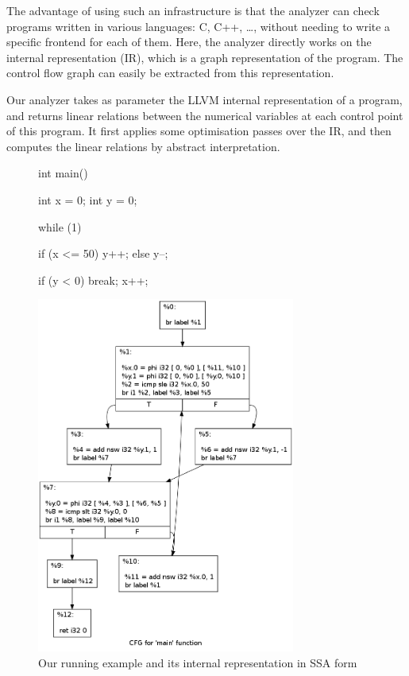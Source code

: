 \documentclass[a4paper,english,titlepage,11pt]{article}
\begin{document}
The advantage of using such an infrastructure is that the analyzer can check
programs written in various languages: C, C++, \dots, without needing to write
a specific frontend for each of them. Here, the analyzer directly works on the
internal representation (IR), which is a graph representation of
the program. The control flow graph can easily be extracted from
this representation.

Our analyzer takes as parameter the LLVM internal representation of a program,
and returns linear relations between the numerical variables at each control
point of this program. It first applies some optimisation passes over the IR,
and then computes the linear relations by abstract interpretation.

\begin{figure}[!h]
\begin{minipage}[c]{.45\linewidth}
\begin{C}
int main() {
   int x = 0;
   int y = 0;

   while (1) {
      if (x <= 50) y++;
      else y--;

      if (y < 0) break;
      x++;
   }
}
\end{C}
\end{minipage}
\begin{minipage}[c]{.45\linewidth}
\includegraphics[width=8.5cm]{"images/cfg_gopan"}
\end{minipage}
\caption{Our running example and its internal representation in SSA form}
\label{IR}
\end{figure}
\FloatBarrier
\end{document}
